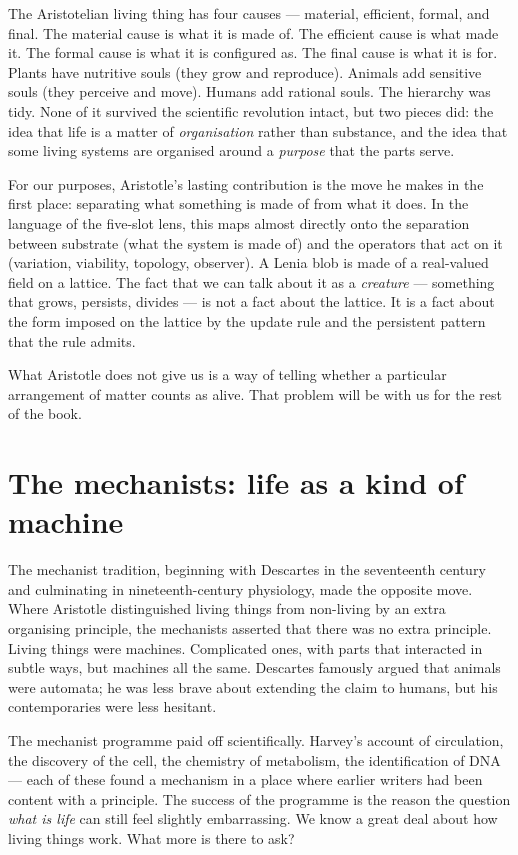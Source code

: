 The Aristotelian living thing has four causes --- material, efficient,
formal, and final. The material cause is what it is made of. The efficient
cause is what made it. The formal cause is what it is configured as. The
final cause is what it is for. Plants have nutritive souls (they grow and
reproduce). Animals add sensitive souls (they perceive and move). Humans
add rational souls. The hierarchy was tidy. None of it survived the
scientific revolution intact, but two pieces did: the idea that life is a
matter of \emph{organisation} rather than substance, and the idea that
some living systems are organised around a \emph{purpose} that the parts
serve.

For our purposes, Aristotle's lasting contribution is the move he makes in
the first place: separating what something is made of from what it does.
In the language of the five-slot lens, this maps almost directly onto the
separation between substrate (what the system is made of) and the
operators that act on it (variation, viability, topology, observer). A
Lenia blob is made of a real-valued field on a lattice. The fact that we
can talk about it as a \emph{creature} --- something that grows, persists,
divides --- is not a fact about the lattice. It is a fact about the form
imposed on the lattice by the update rule and the persistent pattern that
the rule admits.

What Aristotle does not give us is a way of telling whether a particular
arrangement of matter counts as alive. That problem will be with us for
the rest of the book.

\section{The mechanists: life as a kind of machine}

The mechanist tradition, beginning with Descartes in the seventeenth
century and culminating in nineteenth-century physiology, made the
opposite move. Where Aristotle distinguished living things from non-living
by an extra organising principle, the mechanists asserted that there was
no extra principle. Living things were machines. Complicated ones, with
parts that interacted in subtle ways, but machines all the same. Descartes
famously argued that animals were automata; he was less brave about
extending the claim to humans, but his contemporaries were less hesitant.

The mechanist programme paid off scientifically. Harvey's account of
circulation, the discovery of the cell, the chemistry of metabolism, the
identification of DNA --- each of these found a mechanism in a place where
earlier writers had been content with a principle. The success of the
programme is the reason the question \emph{what is life} can still feel
slightly embarrassing. We know a great deal about how living things work.
What more is there to ask?

